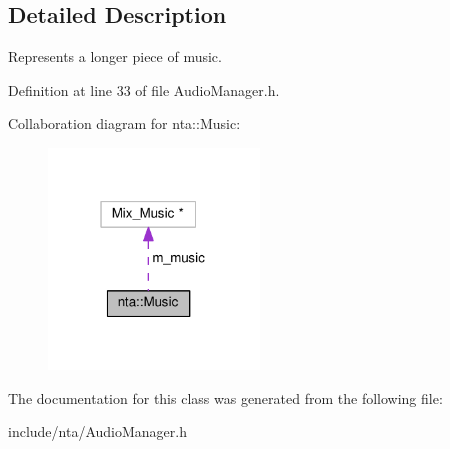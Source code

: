 \subsection{Detailed Description}
Represents a longer piece of music. 

Definition at line 33 of file Audio\+Manager.\+h.



Collaboration diagram for nta\+:\+:Music\+:
\nopagebreak
\begin{figure}[H]
\begin{center}
\leavevmode
\includegraphics[width=159pt]{d5/d16/classnta_1_1Music__coll__graph}
\end{center}
\end{figure}


The documentation for this class was generated from the following file\+:\begin{DoxyCompactItemize}
\item 
include/nta/Audio\+Manager.\+h\end{DoxyCompactItemize}
